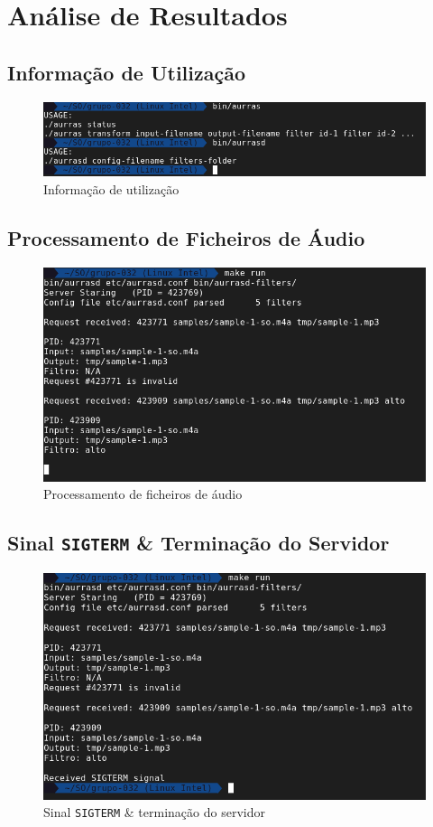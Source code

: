 \documentclass[a4paper, 11pt]{article}
\begin{document}
\pagebreak

\section{Análise de Resultados}
\label{sec:resultados}

\subsection*{Informação de Utilização}

\begin{figure}[H]
    \centering
    \includegraphics[width=.8\textwidth]{img/usage.png}
    \caption{Informação de utilização}
\end{figure}

\subsection*{Processamento de Ficheiros de Áudio}

\begin{figure}[H]
    \centering
    \includegraphics[width=.8\textwidth]{img/server.png}
    \caption{Processamento de ficheiros de áudio}
\end{figure}

\subsection*{Sinal \texttt{SIGTERM} \& Terminação do Servidor}

\begin{figure}[H]
    \centering
    \includegraphics[width=.8\textwidth]{img/sigterm.png}
    \caption{Sinal \texttt{SIGTERM} \& terminação do servidor}
\end{figure}
\end{document}
